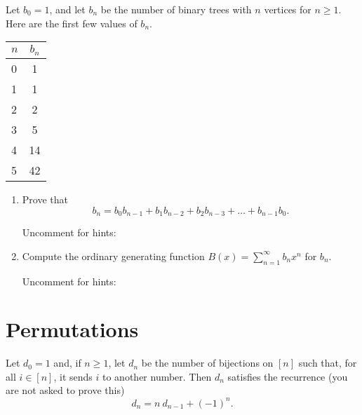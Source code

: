 \documentclass[12pt]{amsart}
\begin{document}
Let $b_0=1$, and let $b_n$ be the number of binary trees with $n$ vertices for $n \geq 1$. Here are the first few values of $b_n$.
\begin{center}
\begin{tabular}{ l c }
  $n$ & $b_n$  \\
  \hline
   0 & 1 \\
  1 & 1 \\
  2 & 2  \\
  3 & 5 \\
  4 & 14 \\
  5 & 42
\end{tabular}
\end{center}
\begin{enumerate}
\item Prove that \[b_n=b_0 b_{n-1} + b_1 b_{n-2} + b_2 b_{n-3} + \dots + b_{n-1} b_0.\]

{\tiny \noindent Uncomment for hints:}

\item Compute the ordinary generating function $B(x)=\sum_{n=1}^\infty b_n x^n$ for $b_n$. 

{\tiny \noindent Uncomment for hints:}

 \end{enumerate}


\section{%
Permutations
}

Let $d_0=1$ and, if $n \geq 1$, let $d_n$ be the number of bijections on $[n]$ such that, for all $i\in [n]$, it sends $i$ to another number. 
Then $d_n$ satisfies the recurrence (you are not asked to prove this) 
\begin{equation}
\label{eq:dn}
d_n = n ~ d_{n-1} + (-1)^n.
\end{equation}
\end{document}
